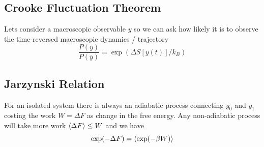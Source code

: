 \documentclass{/home/ben/Templates/notebook}
\begin{document}
	\subsection*{Crooke Fluctuation Theorem}
	
	Lets consider a macroscopic observable $y$ so we can ask how likely it is to observe the time-reversed macroscopic dynamics / trajectory
	\begin{equation}
	\frac{P \left( y \right)}{P \left( \bar{y} \right)} = \exp(\Delta S[y(t)] / k_B)
	\end{equation}
	
	\subsection*{Jarzynski Relation}
	
	For an isolated system there is always an adiabatic process connecting $y_0$ and $y_1$ costing the work $W = \Delta F$ as change in the free energy. Any non-adiabatic process will take more work $\expval{\Delta F} \leq W$ and we have
	\begin{equation}
	\exp(- \Delta F) = \expval{\exp(-\beta W)}
	\end{equation}
\end{document}
